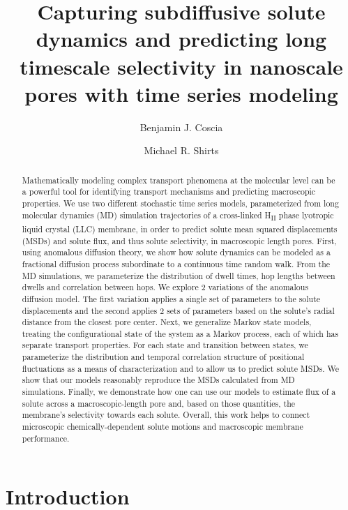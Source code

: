 \documentclass[12pt]{article}
\title{Capturing subdiffusive solute dynamics and predicting long timescale selectivity in nanoscale pores
with time series modeling}
\author{Benjamin J. Coscia \and Michael R. Shirts}
\begin{document}
  \graphicspath{{./figures/}}
  \maketitle
  
  \begin{abstract}
  
  Mathematically modeling complex transport phenomena at the molecular level 
  can be a powerful tool for identifying transport mechanisms and predicting
  macroscopic properties. We use two different stochastic time series models,
  parameterized from long molecular dynamics (MD) simulation trajectories of
  a cross-linked H\textsubscript{II} phase lyotropic liquid crystal (LLC) 
  membrane, in order to predict solute mean squared displacements (MSDs) 
  and solute flux, and thus solute selectivity, in macroscopic length pores. 
  First, using anomalous diffusion theory, we show how solute dynamics can be
  modeled as a fractional diffusion process subordinate to a continuous time 
  random walk. From the MD simulations, we parameterize the distribution of 
  dwell times, hop lengths between dwells and correlation between hops. We 
  explore 2 variations of the anomalous diffusion model. The first variation
  applies a single set of parameters to the solute displacements and the second
  applies 2 sets of parameters based on the solute's radial distance from the
  closest pore center. Next, we generalize Markov state models, treating the
  configurational state of the system as a Markov process, each
  of which has separate transport properties. For each state and transition
  between states, we parameterize the distribution and temporal correlation 
  structure of positional fluctuations as a means of characterization and to 
  allow us to predict solute MSDs. We show that our models reasonably reproduce
  the MSDs calculated from MD simulations. Finally, we demonstrate how one can
  use our models to estimate flux of a solute across a macroscopic-length pore
  and, based on those quantities, the membrane's selectivity towards each solute.
  Overall, this work helps to connect microscopic chemically-dependent solute 
  motions and macroscopic membrane performance.

  \end{abstract}

  \section{Introduction}
\end{document}
